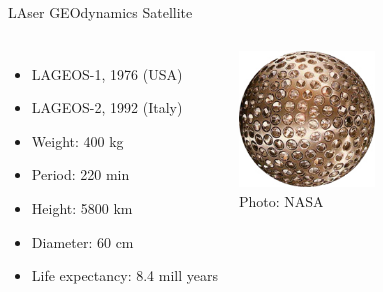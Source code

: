 \documentclass[12pt]{beamer}
\begin{document}
\begin{frame}{LAser GEOdynamics Satellite}
  \begin{columns}
      \begin{itemize}
        \item LAGEOS-1, 1976 (USA) 
        \item LAGEOS-2, 1992 (Italy)
        \item Weight: 400 kg
        \item Period: 220 min
        \item Height: 5800 km
        \item Diameter: 60 cm
        \item Life expectancy: 8.4 mill years 
      \end{itemize}
      
        \includegraphics[width=0.7\textwidth]{figure/lageos_1.jpg} \\Photo: NASA
  \end{columns}
  
\end{frame}
\end{document}
